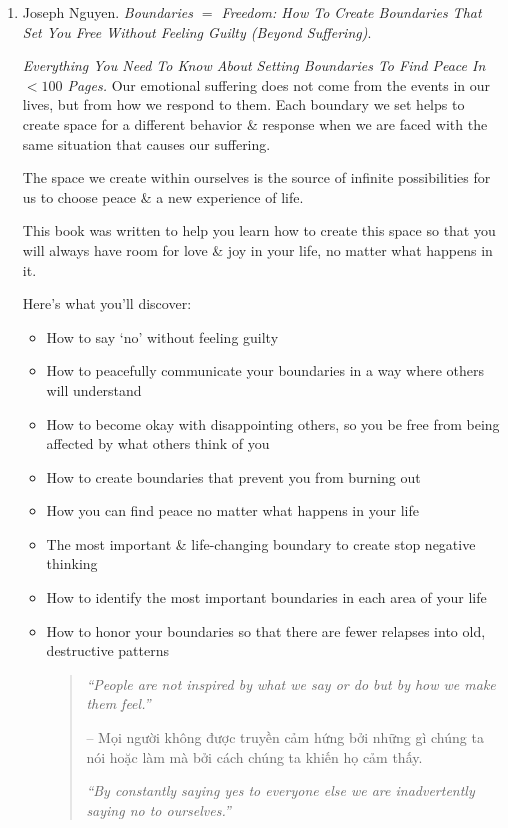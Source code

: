 \documentclass{article}
\begin{document}
\begin{enumerate}
	Beyond everything you think is your true essence that has been patiently waiting to be discovered.

	Welcome home.
	\item {\sc Joseph Nguyen}. {\it Boundaries $=$ Freedom: How To Create Boundaries That Set You Free Without Feeling Guilty (Beyond Suffering)}. {}

	{\it Everything You Need To Know About Setting Boundaries To Find Peace In $< 100$ Pages.} Our emotional suffering does not come from the events in our lives, but from how we respond to them. Each boundary we set helps to create space for a different behavior \& response when we are faced with the same situation that causes our suffering.

	The space we create within ourselves is the source of infinite possibilities for us to choose peace \& a new experience of life.

	This book was written to help you learn how to create this space so that you will always have room for love \& joy in your life, no matter what happens in it.

	Here's what you'll discover:
	\begin{itemize}
		\item How to say `no' without feeling guilty
		\item How to peacefully communicate your boundaries in a way where others will understand
		\item How to become okay with disappointing others, so you be free from being affected by what others think of you
		\item How to create boundaries that prevent you from burning out
		\item How you can find peace no matter what happens in your life
		\item The most important \& life-changing boundary to create stop negative thinking
		\item How to identify the most important boundaries in each area of your life
		\item How to honor your boundaries so that there are fewer relapses into old, destructive patterns
		\begin{quotation}
			{\it``People are not inspired by what we say or do but by how we make them feel.''}

			-- Mọi người không được truyền cảm hứng bởi những gì chúng ta nói hoặc làm mà bởi cách chúng ta khiến họ cảm thấy.

			{\it``By constantly saying yes to everyone else we are inadvertently saying no to ourselves.''}


\end{quotation}
\end{itemize}
\end{enumerate}
\end{document}
